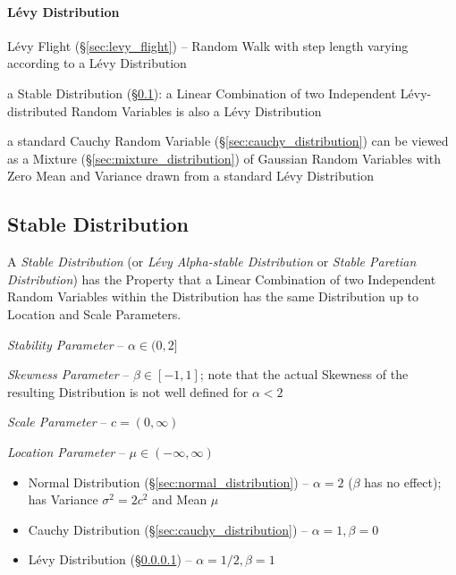 


\paragraph{L\'evy Distribution}\label{sec:levy_distribution}\hfill

L\'evy Flight (\S\ref{sec:levy_flight}) -- Random Walk with step length varying
according to a L\'evy Distribution

a Stable Distribution (\S\ref{sec:stable_distribution}): a Linear Combination of
two Independent L\'evy-distributed Random Variables is also a L\'evy
Distribution

a standard Cauchy Random Variable (\S\ref{sec:cauchy_distribution}) can be
viewed as a Mixture (\S\ref{sec:mixture_distribution}) of Gaussian Random
Variables with Zero Mean and Variance drawn from a standard L\'evy Distribution



\subsection{Stable Distribution}\label{sec:stable_distribution}

A \emph{Stable Distribution} (or \emph{L\'evy Alpha-stable Distribution} or
\emph{Stable Paretian Distribution}) has the Property that a Linear Combination
of two Independent Random Variables within the Distribution has the same
Distribution up to Location and Scale Parameters.

\emph{Stability Parameter} -- $\alpha \in (0, 2]$

\emph{Skewness Parameter} -- $\beta \in [-1, 1]$; note that the actual Skewness
of the resulting Distribution is not well defined for $\alpha < 2$

\emph{Scale Parameter} -- $c = (0, \infty)$

\emph{Location Parameter} -- $\mu \in (-\infty, \infty)$

\begin{itemize}
  \item Normal Distribution (\S\ref{sec:normal_distribution}) -- $\alpha = 2$
    ($\beta$ has no effect); has Variance $\sigma^2 = 2c^2$ and Mean $\mu$
  \item Cauchy Distribution (\S\ref{sec:cauchy_distribution}) --
    $\alpha = 1, \beta = 0$
  \item L\'evy Distribution (\S\ref{sec:levy_distribution}) --
    $\alpha = 1/2, \beta = 1$
\end{itemize}

